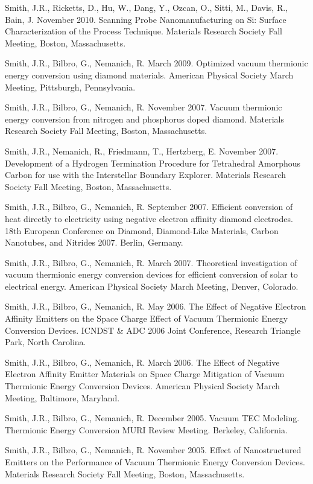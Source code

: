 \documentclass[letterpaper,margin,line]{res}
\begin{document}
\begin{resume}
Smith, J.R., Ricketts, D., Hu, W., Dang, Y., Ozcan, O., Sitti, M., Davis, R., Bain, J. November 2010. Scanning Probe Nanomanufacturing on Si: Surface Characterization of the Process Technique. Materials Research Society Fall Meeting, Boston, Massachusetts.

Smith, J.R., Bilbro, G., Nemanich, R. March 2009. Optimized vacuum thermionic energy conversion using diamond materials. American Physical Society March Meeting, Pittsburgh, Pennsylvania.

Smith, J.R., Bilbro, G., Nemanich, R. November 2007. Vacuum thermionic energy conversion from nitrogen and phosphorus doped diamond. Materials Research Society Fall Meeting, Boston, Massachusetts.

Smith, J.R., Nemanich, R., Friedmann, T., Hertzberg, E. November 2007. Development of a Hydrogen Termination Procedure for Tetrahedral Amorphous Carbon for use with the Interstellar Boundary Explorer. Materials Research Society Fall Meeting, Boston, Massachusetts.

Smith, J.R., Bilbro, G., Nemanich, R. September 2007. Efficient conversion of heat directly to electricity using negative electron affinity diamond electrodes. 18th European Conference on Diamond, Diamond-Like Materials, Carbon Nanotubes, and Nitrides 2007. Berlin, Germany.

Smith, J.R., Bilbro, G., Nemanich, R. March 2007. Theoretical investigation of vacuum thermionic energy conversion devices for efficient conversion of solar to electrical energy. American Physical Society March Meeting, Denver, Colorado.

Smith, J.R., Bilbro, G., Nemanich, R. May 2006. The Effect of Negative Electron Affinity Emitters on the Space Charge Effect of Vacuum Thermionic Energy Conversion Devices. ICNDST \& ADC 2006 Joint Conference, Research Triangle Park, North Carolina.

Smith, J.R., Bilbro, G., Nemanich, R. March 2006. The Effect of Negative Electron Affinity Emitter Materials on Space Charge Mitigation of Vacuum Thermionic Energy Conversion Devices. American Physical Society March Meeting, Baltimore, Maryland.

Smith, J.R., Bilbro, G., Nemanich, R. December 2005. Vacuum TEC Modeling. Thermionic Energy Conversion MURI Review Meeting. Berkeley, California.

Smith, J.R., Bilbro, G., Nemanich, R. November 2005. Effect of Nanostructured Emitters on the Performance of Vacuum Thermionic Energy Conversion Devices. Materials Research Society Fall Meeting, Boston, Massachusetts.


\end{resume}
\end{document}
